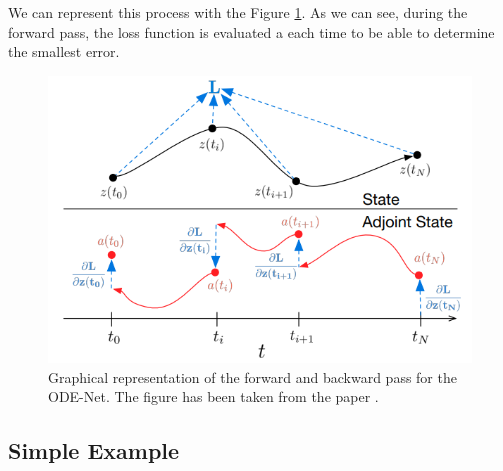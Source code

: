 \documentclass[10pt,a4paper]{article}
\theoremstyle{definition}
\theoremstyle{definition}
\theoremstyle{definition}
\begin{document}
%
%
%
%

We can represent this process with the Figure \ref{process}. As we can see, during the forward pass, the loss function is evaluated a each time to be able to determine the smallest error.
\begin{figure}[!h]
\center
\includegraphics[scale=0.7]{fig2.png}
\caption{Graphical representation of the forward and backward pass for the ODE-Net. The figure has been taken from the paper \cite{1}.}
\label{process}
\end{figure}

\subsection{Simple Example}
\end{document}
